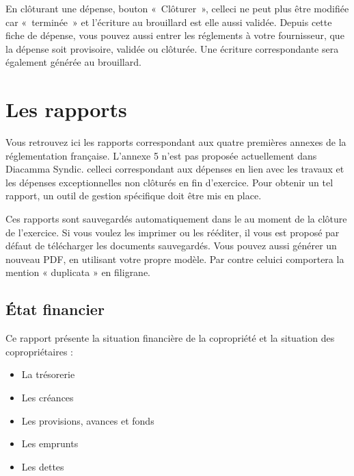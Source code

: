 \documentclass[a4paper,10pt,oneside,french]{sphinxmanual}
\begin{document}
En clôturant une dépense, bouton « Clôturer », celle\sphinxhyphen{}ci ne peut plus être modifiée car « terminée » et l’écriture au brouillard est elle aussi validée.
Depuis cette fiche de dépense, vous pouvez aussi entrer les réglements à votre fournisseur, que la dépense soit provisoire, validée ou clôturée. Une écriture correspondante sera également générée au brouillard.


\section{Les rapports}
\label{\detokenize{condominium/report:les-rapports}}\label{\detokenize{condominium/report::doc}}
Vous retrouvez ici les rapports correspondant aux quatre premières annexes de la réglementation française.
L’annexe 5 n’est pas proposée actuellement dans Diacamma Syndic. celle\sphinxhyphen{}ci correspondant aux dépenses en lien avec les travaux et les dépenses exceptionnelles non clôturés en fin d’exercice. Pour obtenir un tel rapport, un outil de gestion spécifique doit être mis en place.

Ces rapports sont sauvegardés automatiquement dans le  au moment de la clôture de l’exercice.
Si vous voulez les imprimer ou les rééditer, il vous est proposé par défaut de télécharger les documents sauvegardés.
Vous pouvez aussi générer un nouveau PDF, en utilisant votre propre modèle.
Par contre celui\sphinxhyphen{}ci comportera la mention « duplicata » en filigrane.


\subsection{État financier}
\label{\detokenize{condominium/report:etat-financier}}
Ce rapport présente la situation financière de la copropriété et la situation des copropriétaires :
\begin{itemize}
\item {} 
La trésorerie

\item {} 
Les créances

\item {} 
Les provisions, avances et fonds

\item {} 
Les emprunts

\item {} 
Les dettes

\end{itemize}
\end{document}
